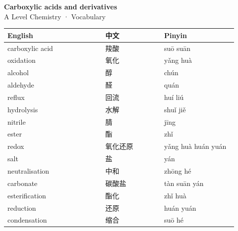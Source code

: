 \documentclass[11pt]{article}
\begin{document}
\begin{center}
  {\LARGE\bfseries Carboxylic acids and derivatives}\\[0.35em]
  {\large A Level Chemistry · Vocabulary}
\end{center}
\vspace{0.6em}

\begin{longtable}{@{}p{0.40\linewidth}p{0.24\linewidth}p{0.30\linewidth}@{}}
\toprule
\textbf{English} & \textbf{中文} & \textbf{Pinyin} \\
\midrule
\endhead
\bottomrule
\endlastfoot
carboxylic acid & 羧酸 & suō suān \\
oxidation & 氧化 & yǎng huà \\
alcohol & 醇 & chún \\
aldehyde & 醛 & quán \\
reflux & 回流 & huí liú \\
hydrolysis & 水解 & shuǐ jiě \\
nitrile & 腈 & jīng \\
ester & 酯 & zhǐ \\
redox & 氧化还原 & yǎng huà huán yuán \\
salt & 盐 & yán \\
neutralisation & 中和 & zhōng hé \\
carbonate & 碳酸盐 & tàn suān yán \\
esterification & 酯化 & zhǐ huà \\
reduction & 还原 & huán yuán \\
condensation & 缩合 & suō hé \\
\end{longtable}
\end{document}
